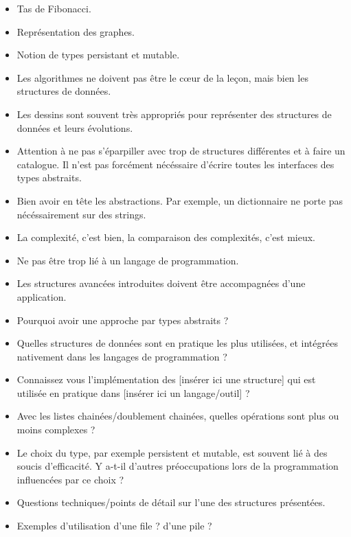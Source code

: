 \documentclass{agregfiche}
\begin{document}
\secidees

\begin{itemize}
	\item Tas de Fibonacci.
	\item Représentation des graphes.
    	\item Notion de types persistant et mutable.
\end{itemize}

\secpieges

\begin{itemize}
	\item Les algorithmes ne doivent pas être le c\oe ur de la leçon, mais bien les structures de données.
	\item Les dessins sont souvent très appropriés pour représenter des structures de données et leurs évolutions.
   	\item Attention à ne pas s'éparpiller avec trop de structures différentes et à faire un catalogue. Il n'est pas forcément nécéssaire d'écrire toutes les interfaces des types abstraits.
	\item Bien avoir en tête les abstractions. Par exemple, un dictionnaire ne porte pas nécéssairement sur des strings.
	\item La complexité, c'est bien, la comparaison des complexités, c'est mieux.
	\item Ne pas être trop lié à un langage de programmation.
	\item Les structures avancées introduites doivent être accompagnées d'une application.
\end{itemize}

\secquestionsclassiques

\begin{itemize}
	\item Pourquoi avoir une approche par types abstraits ?
	\item Quelles structures de données sont en pratique les plus
	utilisées, et intégrées nativement dans les langages de
	programmation ?
	\item Connaissez vous l'implémentation des [insérer ici une
	structure] qui est utilisée en pratique dans [insérer ici un langage/outil] ?
	\item Avec les listes chainées/doublement chainées, quelles
	opérations sont plus ou moins complexes ?
	\item Le choix du type, par exemple persistent et mutable, est souvent lié à des soucis d'efficacité. Y a-t-il d'autres préoccupations lors de la programmation influencées par ce choix ?
    \item Questions techniques/points de détail sur l'une des
    structures présentées.
    \item Exemples d'utilisation d'une file ? d'une pile ?

\end{itemize}
\end{document}
